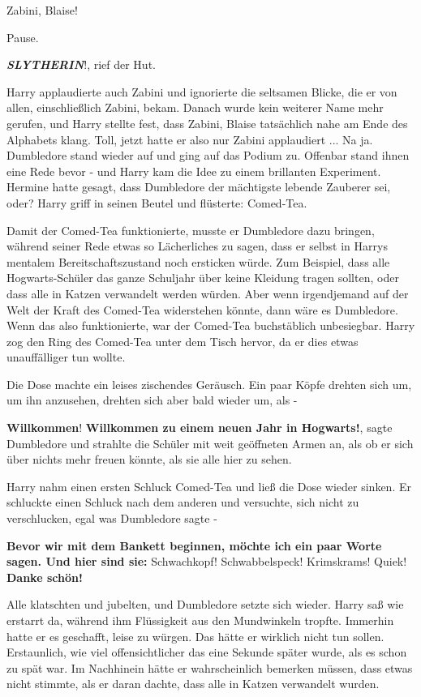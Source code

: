 \glqq{}Zabini, Blaise!\grqq{}

Pause.

\glqq{}\textbf{\emph{SLYTHERIN}}!\grqq{}, rief der Hut.

Harry applaudierte auch Zabini und ignorierte die seltsamen Blicke, die er von
allen, einschließlich Zabini, bekam. Danach wurde kein weiterer Name mehr
gerufen, und Harry stellte fest, dass \glqq{}Zabini, Blaise\grqq{} tatsächlich
nahe am Ende des Alphabets klang. Toll, jetzt hatte er also nur Zabini
applaudiert ... Na ja. Dumbledore stand wieder auf und ging auf das Podium zu.
Offenbar stand ihnen eine Rede bevor - und Harry kam die Idee zu einem
brillanten Experiment. Hermine hatte gesagt, dass Dumbledore der mächtigste
lebende Zauberer sei, oder? Harry griff in seinen Beutel und flüsterte: \glqq{}
Comed-Tea\grqq{}.

Damit der Comed-Tea funktionierte, musste er Dumbledore dazu bringen, während
seiner Rede etwas so Lächerliches zu sagen, dass er selbst in Harrys mentalem
Bereitschaftszustand noch ersticken würde. Zum Beispiel, dass alle
Hogwarts-Schüler das ganze Schuljahr über keine Kleidung tragen sollten, oder
dass alle in Katzen verwandelt werden würden. Aber wenn irgendjemand auf der
Welt der Kraft des Comed-Tea widerstehen könnte, dann wäre es Dumbledore. Wenn
das also funktionierte, war der Comed-Tea buchstäblich unbesiegbar. Harry zog
den Ring des Comed-Tea unter dem Tisch hervor, da er dies etwas unauffälliger
tun wollte.

Die Dose machte ein leises zischendes Geräusch. Ein paar Köpfe drehten sich um,
um ihn anzusehen, drehten sich aber bald wieder um, als -

\glqq{}\textbf{Willkommen}! \textbf{Willkommen zu einem neuen Jahr in
Hogwarts!}\grqq{}, sagte Dumbledore und strahlte die Schüler mit weit geöffneten
Armen an, als ob er sich über nichts mehr freuen könnte, als sie alle hier zu
sehen.

Harry nahm einen ersten Schluck Comed-Tea und ließ die Dose wieder sinken. Er
schluckte einen Schluck nach dem anderen und versuchte, sich nicht zu
verschlucken, egal was Dumbledore sagte -

\textbf{\glqq{}Bevor wir mit dem Bankett beginnen, möchte ich ein paar Worte
sagen. Und hier sind sie:} Schwachkopf! Schwabbelspeck! Krimskrams! Quiek!
\textbf{Danke schön!\grqq{}}

Alle klatschten und jubelten, und Dumbledore setzte sich wieder. Harry saß wie
erstarrt da, während ihm Flüssigkeit aus den Mundwinkeln tropfte. Immerhin hatte
er es geschafft, leise zu würgen. Das hätte er wirklich nicht tun sollen.
Erstaunlich, wie viel offensichtlicher das eine Sekunde später wurde, als es
schon zu spät war. Im Nachhinein hätte er wahrscheinlich bemerken müssen, dass
etwas nicht stimmte, als er daran dachte, dass alle in Katzen verwandelt wurden.


